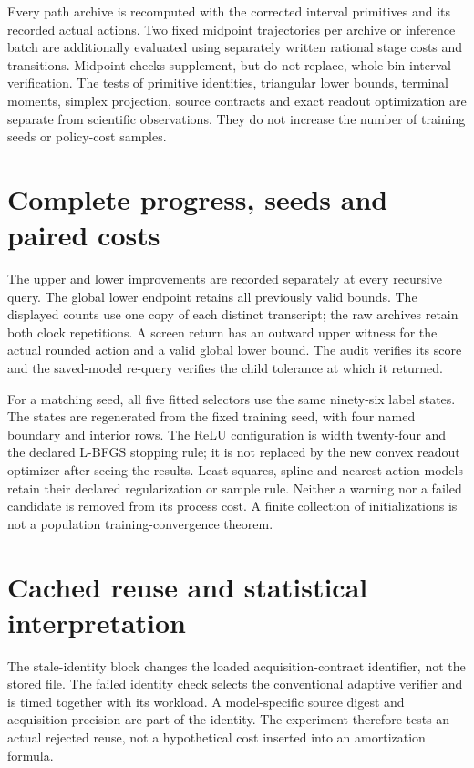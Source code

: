 Every path archive is recomputed with the corrected interval primitives and its recorded actual actions. Two fixed midpoint trajectories per archive or inference batch are additionally evaluated using separately written rational stage costs and transitions. Midpoint checks supplement, but do not replace, whole-bin interval verification. The tests of primitive identities, triangular lower bounds, terminal moments, simplex projection, source contracts and exact readout optimization are separate from scientific observations. They do not increase the number of training seeds or policy-cost samples.

\section{Complete progress, seeds and paired costs}\label{supp:records67}


The upper and lower improvements are recorded separately at every recursive query. The global lower endpoint retains all previously valid bounds. The displayed counts use one copy of each distinct transcript; the raw archives retain both clock repetitions. A screen return has an outward upper witness for the actual rounded action and a valid global lower bound. The audit verifies its score and the saved-model re-query verifies the child tolerance at which it returned.


For a matching seed, all five fitted selectors use the same ninety-six label states. The states are regenerated from the fixed training seed, with four named boundary and interior rows. The ReLU configuration is width twenty-four and the declared L-BFGS stopping rule; it is not replaced by the new convex readout optimizer after seeing the results. Least-squares, spline and nearest-action models retain their declared regularization or sample rule. Neither a warning nor a failed candidate is removed from its process cost. A finite collection of initializations is not a population training-convergence theorem.

\section{Cached reuse and statistical interpretation}\label{supp:reuse67}

The stale-identity block changes the loaded acquisition-contract identifier, not the stored file. The failed identity check selects the conventional adaptive verifier and is timed together with its workload. A model-specific source digest and acquisition precision are part of the identity. The experiment therefore tests an actual rejected reuse, not a hypothetical cost inserted into an amortization formula.

